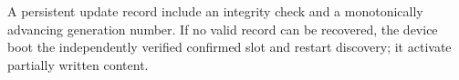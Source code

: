 A persistent update record \must include an integrity check and a monotonically
advancing generation number. If no valid record can be recovered, the device
\must boot the independently verified confirmed slot and restart discovery; it
\mustnot activate partially written content.

